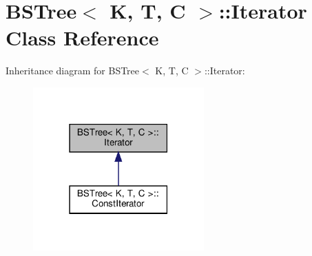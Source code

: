 \hypertarget{class_b_s_tree_1_1_iterator}{}\section{B\+S\+Tree$<$ K, T, C $>$\+:\+:Iterator Class Reference}
\label{class_b_s_tree_1_1_iterator}


Inheritance diagram for B\+S\+Tree$<$ K, T, C $>$\+:\+:Iterator\+:\nopagebreak
\begin{figure}[H]
\begin{center}
\leavevmode
\includegraphics[width=186pt]{class_b_s_tree_1_1_iterator__inherit__graph}
\end{center}
\end{figure}
